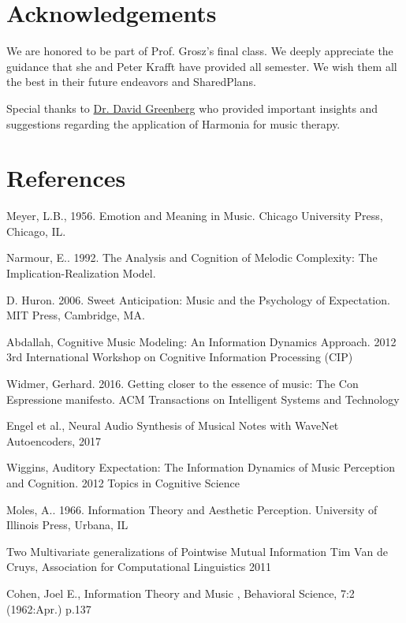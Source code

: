 \documentclass[final,authoryear,5p,times,twocolumn]{elsarticle}
\begin{document}
 
\section*{Acknowledgements}

We are honored to be part of Prof. Grosz's final class. We deeply appreciate the guidance that she and Peter Krafft have provided all semester. We wish them all the best in their future endeavors and SharedPlans.

Special thanks to \href{https://www.psychologytoday.com/experts/david-m-greenberg-phd}{Dr. David Greenberg} who provided important insights and suggestions regarding the application of Harmonia for music therapy.

\section*{References}

 

Meyer, L.B., 1956. Emotion and Meaning in Music. Chicago University Press, Chicago, IL.

Narmour, E.. 1992. The Analysis and Cognition of Melodic Complexity: The Implication-Realization Model.

D. Huron. 2006. Sweet Anticipation: Music and the Psychology of Expectation. MIT Press, Cambridge, MA.

Abdallah, Cognitive Music Modeling: An Information Dynamics Approach. 2012 3rd International Workshop on Cognitive Information Processing (CIP)

Widmer, Gerhard. 2016. Getting closer to the essence of music: The Con Espressione manifesto. ACM Transactions on Intelligent Systems and Technology

Engel et al., Neural Audio Synthesis of Musical Notes with WaveNet Autoencoders, 2017

Wiggins, Auditory Expectation: The Information Dynamics of Music Perception and Cognition. 2012 Topics in Cognitive Science

Moles, A.. 1966. Information Theory and Aesthetic Perception. University of Illinois Press, Urbana, IL

Two Multivariate generalizations of Pointwise Mutual Information Tim Van de Cruys, Association for Computational Linguistics 2011

Cohen, Joel E., Information Theory and Music , Behavioral Science, 7:2 (1962:Apr.) p.137
\end{document}
